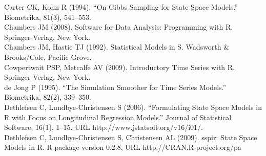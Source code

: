\documentclass[a4paper,14pt]{extarticle}
\begin{document}
Carter CK, Kohn R (1994). “On Gibbs Sampling for State Space Models.” Biometrika, 81(3),
541–553. \\

Chambers JM (2008). Software for Data Analysis: Programming with R. Springer-Verlag,
New York. \\

Chambers JM, Hastie TJ (1992). Statistical Models in S. Wadsworth \& Brooks/Cole, Pacific
Grove. \\

Cowpertwait PSP, Metcalfe AV (2009). Introductory Time Series with R. Springer-Verlag,
New York. \\

de Jong P (1995). “The Simulation Smoother for Time Series Models.” Biometrika, 82(2),
339–350. \\

Dethlefsen C, Lundbye-Christensen S (2006). “Formulating State Space Models in R with
Focus on Longitudinal Regression Models.” Journal of Statistical Software, 16(1), 1–15.
URL http://www.jstatsoft.org/v16/i01/. \\

Dethlefsen C, Lundbye-Christensen S, Christensen AL (2009). sspir: State Space Models in
R. R package version 0.2.8, URL http://CRAN.R-project.org/pa \\

\newpage
\end{document}
